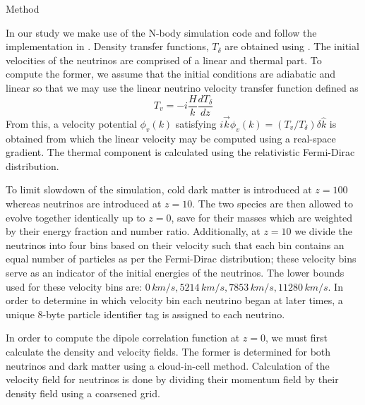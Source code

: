 \begin{section}{Method}
  \label{sec:method}

In our study we make use of the N-body simulation code 
\cpm and follow the implementation in \cite{bib:Inman}. 
Density transfer functions, $T_\delta$ are obtained 
using \camb. The initial velocities of the neutrinos are 
comprised of a linear and thermal part. To compute the former, 
we assume that the initial conditions are adiabatic and linear 
so that we may use the linear neutrino velocity transfer 
function defined as
\begin{equation}
  T_v=-i\frac{H}{k}\frac{dT_{\delta}}{dz}
\end{equation}
From this, a velocity potential $\phi_{v}(k)$ satisfying 
$i\overrightarrow{k}\phi_{v}(k)=(T_v/T_\delta)\delta\hat{k}$ 
is obtained from which the linear velocity may be computed 
using a real-space gradient. The thermal component is 
calculated using the relativistic Fermi-Dirac distribution. 

\par To limit slowdown of the simulation, cold dark matter is 
introduced at $z=100$ whereas neutrinos are introduced 
at $z=10$. The two species are then allowed to evolve together 
identically up to $z=0$, save for their masses which are weighted by their
energy fraction and number ratio. Additionally, at $z=10$ we divide the neutrinos 
into four bins based on their velocity such that each bin contains an equal 
number of particles as per the Fermi-Dirac distribution; these 
velocity bins serve as an indicator of the initial energies of 
the neutrinos. The lower bounds used for these velocity bins 
are: $0\,km/s, 5214\,km/s, 7853\, km/s, 11280\,km/s$. In order 
to determine in which velocity bin each neutrino began at later 
times, a unique 8-byte particle identifier tag is assigned to each neutrino. 

\par In order to compute the dipole correlation function at $z=0$, we
 must first calculate the density and velocity fields. The 
former is determined for both neutrinos and dark matter 
using a cloud-in-cell method. Calculation of the 
velocity field for neutrinos is done by dividing their 
momentum field by their density field using a coarsened grid.


\end{section}
